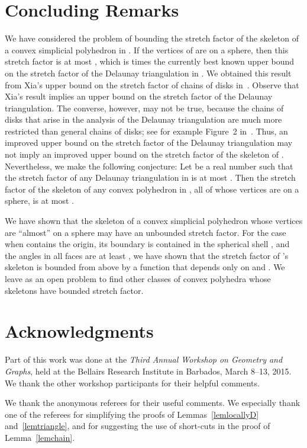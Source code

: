 \documentclass[12pt]{article}
\begin{document}
\section{Concluding Remarks} 
We have considered the problem of bounding the stretch factor of the 
skeleton of a convex simplicial polyhedron  in . If the 
vertices of  are on a sphere, then this stretch factor is at 
most , which is  times the currently best known 
upper bound on the stretch factor of the Delaunay triangulation in 
. We obtained this result from Xia's upper bound on the stretch 
factor of chains of disks in~\cite{x-sfdtl-13}. Observe that Xia's 
result implies an upper bound on the stretch factor of the Delaunay 
triangulation. The converse, however, may not be true, because the 
chains of disks that arise in the analysis of the Delaunay triangulation 
are much more restricted than general chains of disks; see for example 
Figure~2 in~\cite{x-sfdtl-13}. Thus, an improved upper bound on the 
stretch factor of the Delaunay triangulation may not imply an improved 
upper bound on the stretch factor of the skeleton of . Nevertheless, 
we make the following conjecture: Let  be a real number such that 
the stretch factor of any Delaunay triangulation in  is at most 
. Then the stretch factor of the skeleton of any convex polyhedron 
in , all of whose vertices are on a sphere, is at most 
. 
 
We have shown that the skeleton of a convex simplicial polyhedron  
whose vertices are ``almost'' on a sphere may have an unbounded 
stretch factor. For the case when  contains the origin, its 
boundary is contained in the spherical shell , and the 
angles in all faces are at least , we have shown that the stretch 
factor of 's skeleton is bounded from above by a function that 
depends only on  and . We leave as an open problem to find 
other classes of convex polyhedra whose skeletons have bounded stretch 
factor. 
      

\section*{Acknowledgments} 
Part of this work was done at the 
\emph{Third Annual Workshop on Geometry and Graphs}, held at the 
Bellairs Research Institute in Barbados, March 8--13, 2015.  
We thank the other workshop participants for their helpful comments. 

We thank the anonymous referees for their useful comments. 
We especially thank one of the referees for simplifying the proofs of 
Lemmas~\ref{lemlocallyD} and~\ref{lemtriangle}, and for suggesting 
the use of short-cuts in the proof of Lemma~\ref{lemchain}.  
\end{document}
